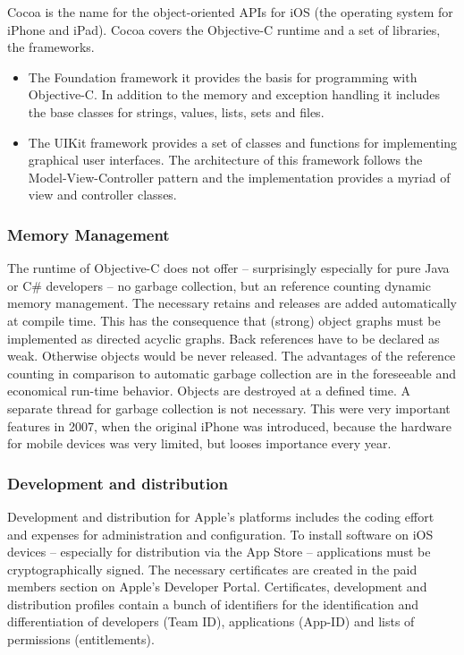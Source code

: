 Cocoa is the name for the object-oriented APIs for iOS (the operating system for iPhone and iPad). 
Cocoa covers the Objective-C runtime and a set of libraries, the frameworks.
\begin{itemize}
\item The Foundation framework it provides the basis for programming with Objective-C. 
In addition to the memory and exception handling it includes the base classes for strings, values, lists, sets and files.
\item The UIKit framework provides a set of classes and functions for implementing graphical user interfaces. 
The architecture of this framework follows the Model-View-Controller pattern 
and the implementation provides a myriad of view and controller classes.
\end{itemize}

\subsubsection{Memory Management}
\label{sec:MemoryManagement}
The runtime of Objective-C does not offer – surprisingly especially for pure Java or C\# developers  – no garbage collection, 
but an reference counting dynamic memory management. The necessary retains and releases are added automatically at compile time.
This has the consequence that (strong) object graphs must be implemented as directed acyclic graphs. Back references have to be declared as weak.
Otherwise objects would be never released. 
The advantages of the reference counting in comparison to automatic garbage collection are in the foreseeable and economical run-time behavior.
Objects are destroyed at a defined time. A separate thread for garbage collection is not necessary. 
This were very important features in 2007, when the original iPhone was introduced, because
the hardware for mobile devices was very limited, but looses importance every year.

\subsubsection{Development and distribution}
\label{sec:DAD}
Development and distribution for Apple's platforms includes the coding effort and expenses for administration and configuration. 
To install software on iOS devices – especially for distribution via the App Store – applications must be cryptographically signed. 
The necessary certificates are created in the paid members section on Apple's Developer Portal. 
Certificates, development and distribution profiles contain a bunch of identifiers for the identification and differentiation of developers (Team ID), 
applications (App-ID) and lists of permissions (entitlements). 

